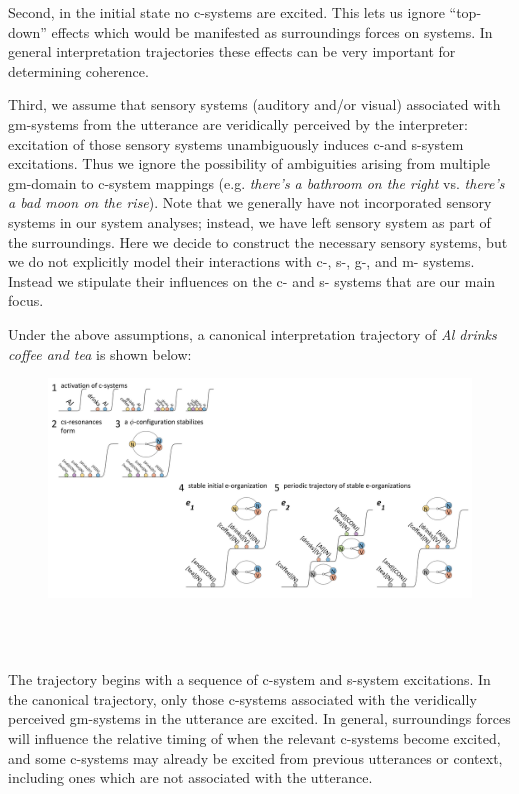 Second, in the initial state no c-systems are excited. This lets us ignore “top-down” effects which would be manifested as surroundings forces on systems. In general interpretation trajectories these effects can be very important for determining coherence.

Third, we assume that sensory systems (auditory and/or visual) associated with gm-systems from the utterance are veridically perceived by the interpreter: excitation of those sensory systems unambiguously induces c-and s-system excitations. Thus we ignore the possibility of ambiguities arising from multiple gm-domain to c-system mappings (e.g. \textit{there’s a bathroom on the right} vs. \textit{there’s a bad moon on the rise}). Note that we generally have not incorporated sensory systems in our system analyses; instead, we have left sensory system as part of the surroundings. Here we decide to construct the necessary sensory systems, but we do not explicitly model their interactions with c-, s-, g-, and m- systems. Instead we stipulate their influences on the c- and s- systems that are our main focus.

Under the above assumptions, a canonical interpretation trajectory of \textit{Al drinks coffee and tea} is shown below:

  
\begin{figure}
\includegraphics[width=\textwidth]{figures/Tilsen-img121.png}
\caption{\missingcaption}
\label{fig:}
\end{figure}
 

\ea%
    \label{ex:key:1}
    \gll\\
        \\
    \glt
    \z

         The trajectory begins with a sequence of c-system and s-system excitations. In the canonical trajectory, only those c-systems associated with the veridically perceived gm-systems in the utterance are excited. In general, surroundings forces will influence the relative timing of when the relevant c-systems become excited, and some c-systems may already be excited from previous utterances or context, including ones which are not associated with the utterance. 

